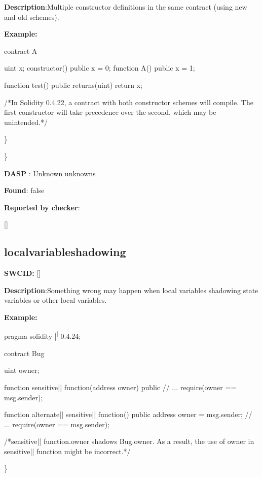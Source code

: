 \documentclass{article}
\begin{document}
\textbf{Description}:Multiple constructor definitions in the same contract (using new and old schemes).


\textbf{Example:} 
\begin{ffcode} 

contract A {
    uint x;
    constructor() public {
        x = 0;
    }
    function A() public {
        x = 1;
    }

    function test() public returns(uint) {
        return x;
    }
}

 /*In Solidity 0.4.22, a contract with both constructor schemes will compile. The first constructor will take precedence over the second, which may be unintended.*/ 

\end{ffcode} 
\} 

\} 

\textbf{DASP} : Unknown unknowns

\textbf{Found}: false

\textbf{Reported by checker}: 
\begin{ffcode} 

[]
\end{ffcode} 
\subsection{local{\textunderscore}variable{\textunderscore}shadowing} 
\textbf{SWC{\textunderscore}ID:} []

\textbf{Description}:Something wrong may happen when local variables shadowing state variables or other local variables.


\textbf{Example:} 
\begin{ffcode} 

pragma solidity |\textsuperscript| 0.4.24;

contract Bug {
    uint owner;

    function sensitive|\textunderscore| function(address owner) public {
        // ...
        require(owner == msg.sender);
    }

    function alternate|\textunderscore| sensitive|\textunderscore| function() public {
        address owner = msg.sender;
        // ...
        require(owner == msg.sender);
    }
}

 /*sensitive|\textunderscore| function.owner shadows Bug.owner. As a result, the use of owner in sensitive|\textunderscore| function might be incorrect.*/ 

\end{ffcode} 
\} 
\end{document}
